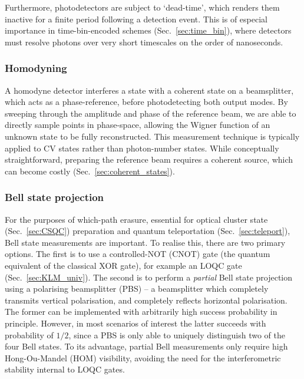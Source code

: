 \documentclass[aps,rmp,twocolumn,amsmath,amssymb,nofootinbib,superscriptaddress,longbibliography,floatfix]{revtex4-1}
\begin{document}
Furthermore, photodetectors are subject to `dead-time', which renders them inactive for a finite period following a detection event. This is of especial importance in time-bin-encoded schemes (Sec.~\ref{sec:time_bin}), where detectors must resolve photons over very short timescales on the order of nanoseconds.

%
%

\subsubsection{Homodyning} \label{sec:homodyne}

A homodyne detector interferes a state with a coherent state on a beamsplitter, which acts as a phase-reference, before photodetecting both output modes. By sweeping through the amplitude and phase of the reference beam, we are able to directly sample points in phase-space, allowing the Wigner function of an unknown state to be fully reconstructed. This measurement technique is typically applied to CV states rather than photon-number states. While conceptually straightforward, preparing the reference beam requires a coherent source, which can become costly (Sec.~\ref{sec:coherent_states}).

%
%

\subsubsection{Bell state projection} \label{sec:bell_proj}

For the purposes of which-path erasure, essential for optical cluster state (Sec.~\ref{sec:CSQC}) preparation and quantum teleportation (Sec.~\ref{sec:teleport}), Bell state measurements are important. To realise this, there are two primary options. The first is to use a controlled-NOT (CNOT) gate (the quantum equivalent of the classical XOR gate), for example an LOQC gate (Sec.~\ref{sec:KLM_univ}). The second is to perform a \emph{partial} Bell state projection using a polarising beamsplitter (PBS) -- a beamsplitter which completely transmits vertical polarisation, and completely reflects horizontal polarisation. The former can be implemented with arbitrarily high success probability in principle. However, in most scenarios of interest the latter succeeds with probability of $1/2$, since a PBS is only able to uniquely distinguish two of the four Bell states. To its advantage, partial Bell measurements only require high Hong-Ou-Mandel (HOM) visibility, avoiding the need for the interferometric stability internal to LOQC gates.
\end{document}
